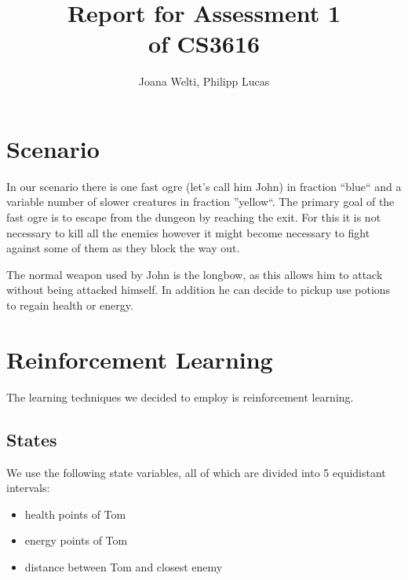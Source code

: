 \documentclass[a4paper,10pt]{scrartcl}
\title{Report for Assessment 1 \\ \large{of CS3616}}
\author{Joana Welti, Philipp Lucas}
\begin{document}

\maketitle
\newpage

\tableofcontents

\newpage

\section{Scenario}
In our scenario there is one fast ogre (let's call him John) in fraction ``blue`` and a variable number of slower creatures in fraction ''yellow``. The primary goal of the fast ogre is to escape from the dungeon by reaching the exit. For this it is not necessary to kill all the enemies however it might become necessary to fight against some of them as they block the way out.\par
The normal weapon used by John is the longbow, as this allows him to attack without being attacked himself. In addition he can decide to pickup use potions to regain health or energy.

\section{Reinforcement Learning}
The learning techniques we decided to employ is reinforcement learning. 

\subsection{States}
We use the following state variables, all of which are divided into 5 equidistant intervals:
\begin{itemize}
 \item health points of Tom
 \item energy points of Tom
 \item distance between Tom and closest enemy
\end{itemize}
\end{document}
